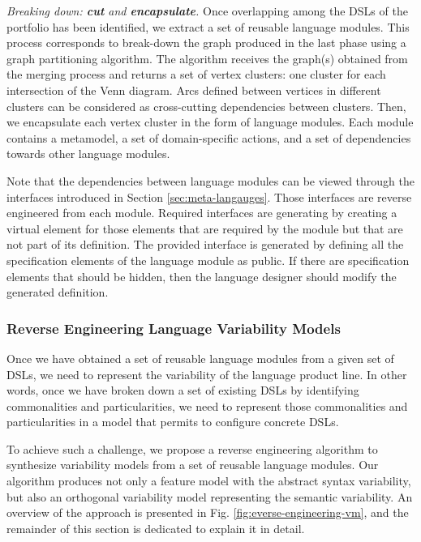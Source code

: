 \vspace{2mm}
\textit{Breaking down: \textbf{cut} and \textbf{encapsulate}.} Once overlapping among the DSLs of the portfolio has been identified, we extract a set of reusable language modules. This process corresponds to break-down the graph produced in the last phase using a graph partitioning algorithm. The algorithm receives the graph(s) obtained from the merging process and returns a set of vertex clusters: one cluster for each intersection of the Venn diagram. Arcs defined between vertices in different clusters can be considered as cross-cutting dependencies between clusters. Then, we encapsulate each vertex cluster in the form of language modules. Each module contains a metamodel, a set of domain-specific actions, and a set of dependencies towards other language modules. 

Note that the dependencies between language modules can be viewed through the interfaces introduced in Section \ref{sec:meta-langauges}. Those interfaces are reverse engineered from each module. Required interfaces are generating by creating a virtual element for those elements that are required by the module but that are not part of its definition. The provided interface is generated by defining all the specification elements of the language module as public. If there are specification elements that should be hidden, then the language designer should modify the generated definition.

\subsubsection{Reverse Engineering Language Variability Models}

Once we have obtained a set of reusable language modules from a given set of DSLs, we need to represent the variability of the language product line. In other words, once we have broken down a set of existing DSLs by identifying commonalities and particularities, we need to represent those commonalities and particularities in a model that permits to configure concrete DSLs. 

To achieve such a challenge, we propose a reverse engineering algorithm to synthesize variability models from a set of reusable language modules. Our algorithm produces not only a feature model with the abstract syntax variability, but also an orthogonal variability model representing the semantic variability. An overview of the approach is presented in Fig. \ref{fig:everse-engineering-vm}, and the remainder of this section is dedicated to explain it in detail. 

